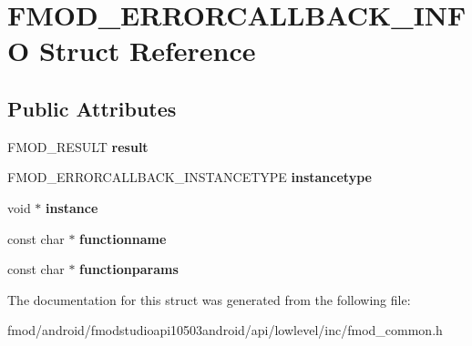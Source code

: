 \hypertarget{struct_f_m_o_d___e_r_r_o_r_c_a_l_l_b_a_c_k___i_n_f_o}{\section{F\+M\+O\+D\+\_\+\+E\+R\+R\+O\+R\+C\+A\+L\+L\+B\+A\+C\+K\+\_\+\+I\+N\+F\+O Struct Reference}
\label{struct_f_m_o_d___e_r_r_o_r_c_a_l_l_b_a_c_k___i_n_f_o}
}
\subsection*{Public Attributes}
\begin{DoxyCompactItemize}
\item 
\hypertarget{struct_f_m_o_d___e_r_r_o_r_c_a_l_l_b_a_c_k___i_n_f_o_ac0e254718b8b463f09d86a2de4a5e087}{F\+M\+O\+D\+\_\+\+R\+E\+S\+U\+L\+T {\bfseries result}}\label{struct_f_m_o_d___e_r_r_o_r_c_a_l_l_b_a_c_k___i_n_f_o_ac0e254718b8b463f09d86a2de4a5e087}

\item 
\hypertarget{struct_f_m_o_d___e_r_r_o_r_c_a_l_l_b_a_c_k___i_n_f_o_a63854db5f977c7f504e42f838143c015}{F\+M\+O\+D\+\_\+\+E\+R\+R\+O\+R\+C\+A\+L\+L\+B\+A\+C\+K\+\_\+\+I\+N\+S\+T\+A\+N\+C\+E\+T\+Y\+P\+E {\bfseries instancetype}}\label{struct_f_m_o_d___e_r_r_o_r_c_a_l_l_b_a_c_k___i_n_f_o_a63854db5f977c7f504e42f838143c015}

\item 
\hypertarget{struct_f_m_o_d___e_r_r_o_r_c_a_l_l_b_a_c_k___i_n_f_o_a1df1960e75ac605fa863d33facac399a}{void $\ast$ {\bfseries instance}}\label{struct_f_m_o_d___e_r_r_o_r_c_a_l_l_b_a_c_k___i_n_f_o_a1df1960e75ac605fa863d33facac399a}

\item 
\hypertarget{struct_f_m_o_d___e_r_r_o_r_c_a_l_l_b_a_c_k___i_n_f_o_add508279d8caeafbcf8edac8df2d5802}{const char $\ast$ {\bfseries functionname}}\label{struct_f_m_o_d___e_r_r_o_r_c_a_l_l_b_a_c_k___i_n_f_o_add508279d8caeafbcf8edac8df2d5802}

\item 
\hypertarget{struct_f_m_o_d___e_r_r_o_r_c_a_l_l_b_a_c_k___i_n_f_o_aa65ddf6d01054310582cdbc46ebed13e}{const char $\ast$ {\bfseries functionparams}}\label{struct_f_m_o_d___e_r_r_o_r_c_a_l_l_b_a_c_k___i_n_f_o_aa65ddf6d01054310582cdbc46ebed13e}

\end{DoxyCompactItemize}


The documentation for this struct was generated from the following file\+:\begin{DoxyCompactItemize}
\item 
fmod/android/fmodstudioapi10503android/api/lowlevel/inc/fmod\+\_\+common.\+h\end{DoxyCompactItemize}
